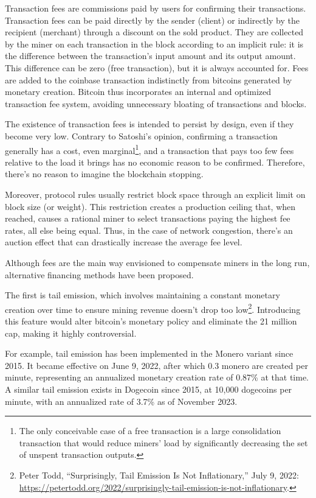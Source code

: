 \documentclass[
  a5paper,
  smalldemyvopaper,10pt,twoside,onecolumn,openright,extrafontsizes,hidelinks]{memoir}
\newlength\drop
\begin{document}
Transaction fees are commissions paid by users for confirming their
transactions. Transaction fees can be paid directly by the sender
(client) or indirectly by the recipient (merchant) through a discount on
the sold product. They are collected by the miner on each transaction in
the block according to an implicit rule: it is the difference between
the transaction's input amount and its output amount. This difference
can be zero (free transaction), but it is always accounted for. Fees are
added to the coinbase transaction indistinctly from bitcoins generated
by monetary creation. Bitcoin thus incorporates an internal and
optimized transaction fee system, avoiding unnecessary bloating of
transactions and blocks.

The existence of transaction fees is intended to persist by design, even
if they become very low. Contrary to Satoshi's opinion, confirming a
transaction generally has a cost, even marginal\footnote{The only
  conceivable case of a free transaction is a large consolidation
  transaction that would reduce miners' load by significantly decreasing
  the set of unspent transaction outputs.}, and a transaction that pays
too few fees relative to the load it brings has no economic reason to be
confirmed. Therefore, there's no reason to imagine the blockchain
stopping.

Moreover, protocol rules usually restrict block space through an
explicit limit on block size (or weight). This restriction creates a
production ceiling that, when reached, causes a rational miner to select
transactions paying the highest fee rates, all else being equal. Thus,
in the case of network congestion, there's an auction effect that can
drastically increase the average fee level.

Although fees are the main way envisioned to compensate miners in the
long run, alternative financing methods have been proposed.

The first is tail emission, which involves maintaining a constant
monetary creation over time to ensure mining revenue doesn't drop too
low\footnote{Peter Todd, ``Surprisingly, Tail Emission Is Not
  Inflationary,'' July 9, 2022:
  \url{https://petertodd.org/2022/surprisingly-tail-emission-is-not-inflationary}.}.
Introducing this feature would alter bitcoin's monetary policy and
eliminate the 21 million cap, making it highly controversial.

For example, tail emission has been implemented in the Monero variant
since 2015. It became effective on June 9, 2022, after which 0.3 monero
are created per minute, representing an annualized monetary creation
rate of 0.87\% at that time. A similar tail emission exists in Dogecoin
since 2015, at 10,000 dogecoins per minute, with an annualized rate of
3.7\% as of November 2023.
\end{document}
